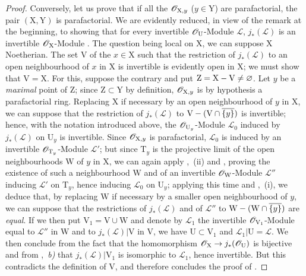 \begin{proof}
Conversely, let us prove that if all the $\mathscr{O}_{\mathrm{X},y}$ ($y\in\mathrm{Y}$) are parafactorial, the pair $(\mathrm{X},\mathrm{Y})$ is parafactorial.
We are evidently reduced, in view of the remark at the beginning, to showing that for every invertible $\mathscr{O}_{\mathrm{U}}$-Module $\mathscr{L}$, $j_*(\mathscr{L})$ is an invertible $\mathscr{O}_{\mathrm{X}}$-Module .
The question being local on $\mathrm{X}$, we can suppose $\mathrm{X}$ Noetherian. The set $\mathrm{V}$ of the $x\in\mathrm{X}$ such that the restriction of $j_*(\mathscr{L})$ to an open neighbourhood of $x$ in $\mathrm{X}$ is invertible is evidently open in $\mathrm{X}$; we must show that $\mathrm{V}=\mathrm{X}$. For this, suppose the contrary and put $\mathrm{Z}=\mathrm{X}-\mathrm{V}\neq\varnothing$. Let $y$ be a \emph{maximal} point of $\mathrm{Z}$; since $\mathrm{Z}\subset\mathrm{Y}$ by definition, $\mathscr{O}_{\mathrm{X},y}$ is by hypothesis a parafactorial ring. Replacing $\mathrm{X}$ if necessary by an open neighbourhood of $y$ in $\mathrm{X}$, we can suppose that the restriction of $j_*(\mathscr{L})$
to $\mathrm{V}-(\mathrm{V}\cap\overline{\{y\}})$ is invertible; hence, with the notation introduced above, the $\mathscr{O}_{\mathrm{U}_y}$-Module $\mathscr{L}_0$ induced by $j_*(\mathscr{L})$ on $\mathrm{U}_y$ is invertible. Since $\mathscr{O}_{\mathrm{X},y}$ is parafactorial, $\mathscr{L}_0$ is induced by an invertible $\mathscr{O}_{\mathrm{T}_y}$-Module $\mathscr{L}'$; but since $\mathrm{T}_y$ is the projective limit of the open neighbourhoods $\mathrm{W}$ of $y$ in $\mathrm{X}$, we can again apply ,~(ii) and , proving the existence of such a neighbourhood $\mathrm{W}$ and of an invertible $\mathscr{O}_{\mathrm{W}}$-Module $\mathscr{L}''$ inducing $\mathscr{L}'$ on $\mathrm{T}_y$, hence inducing $\mathscr{L}_0$ on $\mathrm{U}_y$; applying this time  and ,~(i), we deduce that, by replacing $\mathrm{W}$ if necessary by a smaller open neighbourhood of $y$, we can suppose that the restrictions of $j_*(\mathscr{L})$ and of $\mathscr{L}''$ to $\mathrm{W}-(\mathrm{W}\cap\overline{\{y\}})$ are \emph{equal}. If we then put $\mathrm{V}_1=\mathrm{V}\cup\mathrm{W}$ and denote by $\mathscr{L}_1$ the invertible $\mathscr{O}_{\mathrm{V}_1}$-Module equal to $\mathscr{L}''$ in $\mathrm{W}$ and to $j_*(\mathscr{L})|\mathrm{V}$ in $\mathrm{V}$, we have $\mathrm{U}\subset\mathrm{V}_1$ and $\mathscr{L}_1|\mathrm{U}=\mathscr{L}$. We then conclude from the fact that the homomorphism $\mathscr{O}_{\mathrm{X}}\to j_*(\mathscr{O}_{\mathrm{U}})$ is bijective and from ,~\emph{b)} that $j_*(\mathscr{L})|\mathrm{V}_1$ is isomorphic to $\mathscr{L}_1$, hence invertible. But this contradicts the definition of $\mathrm{V}$, and therefore concludes the proof of .
\end{proof}

